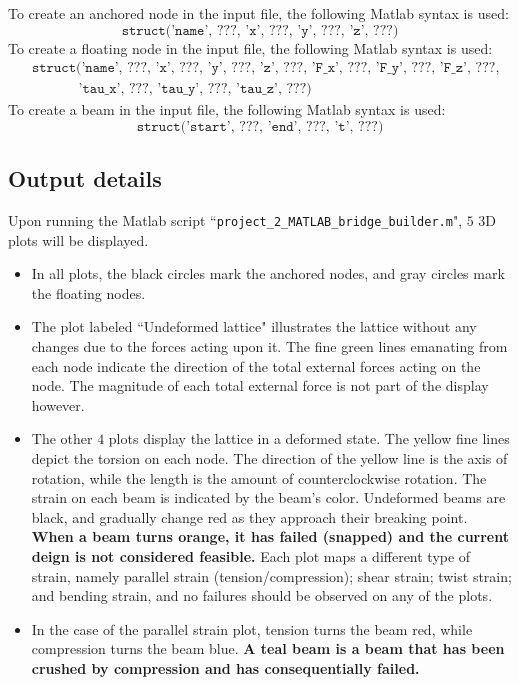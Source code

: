\documentclass{article}
\begin{document}
To create an anchored node in the input file, the following Matlab syntax is used:
\[\texttt{struct('name', \(???\), 'x', \(???\), 'y', \(???\), 'z', \(???\))}\]
To create a floating node in the input file, the following Matlab syntax is used:
\begin{align*}
& \texttt{struct('name', \(???\), 'x', \(???\), 'y', \(???\), 'z', \(???\), 'F\_x', \(???\), 'F\_y', \(???\), 'F\_z', \(???\),} \\ 
& \quad\quad\quad \texttt{ 'tau\_x', \(???\), 'tau\_y', \(???\), 'tau\_z', \(???\))}
\end{align*}
To create a beam in the input file, the following Matlab syntax is used:
\[\texttt{struct('start', \(???\), 'end', \(???\), 't', \(???\))}\]



\subsection{Output details}

Upon running the Matlab script ``\texttt{project\_2\_MATLAB\_bridge\_builder.m}", \(5\) 3D plots will be displayed. 

\begin{itemize}
\item In all plots, the black circles mark the anchored nodes, and gray circles mark the floating nodes.
\item The plot labeled ``Undeformed lattice" illustrates the lattice without any changes due to the forces acting upon it. The fine green lines emanating from each node indicate the direction of the total external forces acting on the node. The magnitude of each total external force is not part of the display however.    
\item The other \(4\) plots display the lattice in a deformed state. The yellow fine lines depict the torsion on each node. The direction of the yellow line is the axis of rotation, while the length is the amount of counterclockwise rotation. The strain on each beam is indicated by the beam's color. Undeformed beams are black, and gradually change red as they approach their breaking point. {\bf When a beam turns orange, it has failed (snapped) and the current deign is not considered feasible.} Each plot maps a different type of strain, namely parallel strain (tension/compression); shear strain; twist strain; and bending strain, and no failures should be observed on any of the plots. 
\item In the case of the parallel strain plot, tension turns the beam red, while compression turns the beam blue. {\bf A teal beam is a beam that has been crushed by compression and has consequentially failed.}   
\end{itemize}
\end{document}
